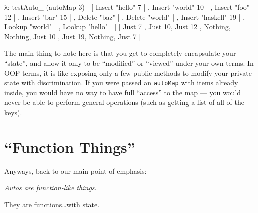 \documentclass[]{article}
\newenvironment{Shaded}{}{}
\newcommand{\DataTypeTok}[1]{\textcolor[rgb]{0.56,0.13,0.00}{{#1}}}
\newcommand{\DecValTok}[1]{\textcolor[rgb]{0.25,0.63,0.44}{{#1}}}
\newcommand{\StringTok}[1]{\textcolor[rgb]{0.25,0.44,0.63}{{#1}}}
\newcommand{\FunctionTok}[1]{\textcolor[rgb]{0.02,0.16,0.49}{{#1}}}
\newcommand{\NormalTok}[1]{{#1}}
\begin{document}
\begin{Shaded}
\begin{Highlighting}[]
\NormalTok{λ}\FunctionTok{:} \NormalTok{testAuto_ (autoMap }\DecValTok{3}\NormalTok{)}
  \FunctionTok{|}  \NormalTok{[ }\DataTypeTok{Insert} \StringTok{"hello"} \DecValTok{7}
  \FunctionTok{|}  \NormalTok{, }\DataTypeTok{Insert} \StringTok{"world"} \DecValTok{10}
  \FunctionTok{|}  \NormalTok{, }\DataTypeTok{Insert} \StringTok{"foo"} \DecValTok{12}
  \FunctionTok{|}  \NormalTok{, }\DataTypeTok{Insert} \StringTok{"bar"} \DecValTok{15}
  \FunctionTok{|}  \NormalTok{, }\DataTypeTok{Delete} \StringTok{"baz"}
  \FunctionTok{|}  \NormalTok{, }\DataTypeTok{Delete} \StringTok{"world"}
  \FunctionTok{|}  \NormalTok{, }\DataTypeTok{Insert} \StringTok{"haskell"} \DecValTok{19}
  \FunctionTok{|}  \NormalTok{, }\DataTypeTok{Lookup} \StringTok{"world"}
  \FunctionTok{|}  \NormalTok{, }\DataTypeTok{Lookup} \StringTok{"hello"}
  \FunctionTok{|}  \NormalTok{]}
\NormalTok{[ }\DataTypeTok{Just} \DecValTok{7} \NormalTok{, }\DataTypeTok{Just} \DecValTok{10}\NormalTok{, }\DataTypeTok{Just} \DecValTok{12}
\NormalTok{, }\DataTypeTok{Nothing}\NormalTok{, }\DataTypeTok{Nothing}\NormalTok{, }\DataTypeTok{Just} \DecValTok{10}
\NormalTok{, }\DataTypeTok{Just} \DecValTok{19}\NormalTok{, }\DataTypeTok{Nothing}\NormalTok{, }\DataTypeTok{Just} \DecValTok{7}  \NormalTok{]}
\end{Highlighting}
\end{Shaded}

The main thing to note here is that you get to completely encapsulate
your ``state'', and allow it only to be ``modified'' or ``viewed'' under
your own terms. In OOP terms, it is like exposing only a few public
methods to modify your private state with discrimination. If you were
passed an \texttt{autoMap} with items already inside, you would have no
way to have full ``access'' to the map --- you would never be able to
perform general operations (such as getting a list of all of the keys).

\section{\texorpdfstring{``Function
Things''}{Function Things}}\label{function-things}

Anyways, back to our main point of emphasis:

\emph{Autos are function-like things}.

They are functions\ldots{}with state.
\end{document}
